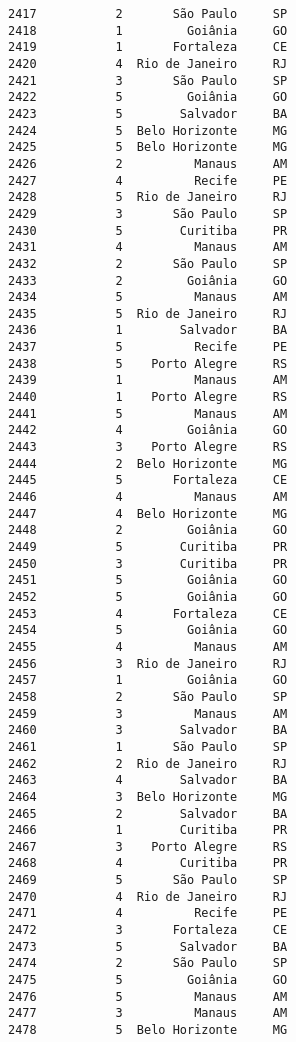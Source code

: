 \documentclass[11pt]{article}
\begin{document}
\begin{Verbatim}[commandchars=\\\{\}]
2417           2       São Paulo     SP  
2418           1         Goiânia     GO  
2419           1       Fortaleza     CE  
2420           4  Rio de Janeiro     RJ  
2421           3       São Paulo     SP  
2422           5         Goiânia     GO  
2423           5        Salvador     BA  
2424           5  Belo Horizonte     MG  
2425           5  Belo Horizonte     MG  
2426           2          Manaus     AM  
2427           4          Recife     PE  
2428           5  Rio de Janeiro     RJ  
2429           3       São Paulo     SP  
2430           5        Curitiba     PR  
2431           4          Manaus     AM  
2432           2       São Paulo     SP  
2433           2         Goiânia     GO  
2434           5          Manaus     AM  
2435           5  Rio de Janeiro     RJ  
2436           1        Salvador     BA  
2437           5          Recife     PE  
2438           5    Porto Alegre     RS  
2439           1          Manaus     AM  
2440           1    Porto Alegre     RS  
2441           5          Manaus     AM  
2442           4         Goiânia     GO  
2443           3    Porto Alegre     RS  
2444           2  Belo Horizonte     MG  
2445           5       Fortaleza     CE  
2446           4          Manaus     AM  
2447           4  Belo Horizonte     MG  
2448           2         Goiânia     GO  
2449           5        Curitiba     PR  
2450           3        Curitiba     PR  
2451           5         Goiânia     GO  
2452           5         Goiânia     GO  
2453           4       Fortaleza     CE  
2454           5         Goiânia     GO  
2455           4          Manaus     AM  
2456           3  Rio de Janeiro     RJ  
2457           1         Goiânia     GO  
2458           2       São Paulo     SP  
2459           3          Manaus     AM  
2460           3        Salvador     BA  
2461           1       São Paulo     SP  
2462           2  Rio de Janeiro     RJ  
2463           4        Salvador     BA  
2464           3  Belo Horizonte     MG  
2465           2        Salvador     BA  
2466           1        Curitiba     PR  
2467           3    Porto Alegre     RS  
2468           4        Curitiba     PR  
2469           5       São Paulo     SP  
2470           4  Rio de Janeiro     RJ  
2471           4          Recife     PE  
2472           3       Fortaleza     CE  
2473           5        Salvador     BA  
2474           2       São Paulo     SP  
2475           5         Goiânia     GO  
2476           5          Manaus     AM  
2477           3          Manaus     AM  
2478           5  Belo Horizonte     MG  

\end{Verbatim}
\end{document}

